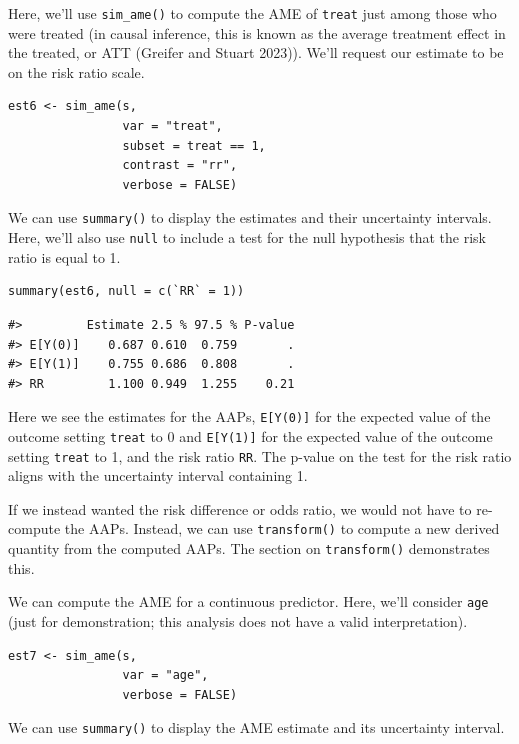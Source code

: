Here, we'll use \texttt{sim\_ame()} to compute the AME of \texttt{treat} just among those who were treated (in causal inference, this is known as the average treatment effect in the treated, or ATT (Greifer and Stuart 2023)). We'll request our estimate to be on the risk ratio scale.

\begin{verbatim}
est6 <- sim_ame(s,
                var = "treat",
                subset = treat == 1,
                contrast = "rr",
                verbose = FALSE)
\end{verbatim}

We can use \texttt{summary()} to display the estimates and their uncertainty intervals. Here, we'll also use \texttt{null} to include a test for the null hypothesis that the risk ratio is equal to 1.

\begin{verbatim}
summary(est6, null = c(`RR` = 1))
\end{verbatim}

\begin{verbatim}
#>         Estimate 2.5 % 97.5 % P-value
#> E[Y(0)]    0.687 0.610  0.759       .
#> E[Y(1)]    0.755 0.686  0.808       .
#> RR         1.100 0.949  1.255    0.21
\end{verbatim}

Here we see the estimates for the AAPs, \texttt{E{[}Y(0){]}} for the expected value of the outcome setting \texttt{treat} to 0 and \texttt{E{[}Y(1){]}} for the expected value of the outcome setting \texttt{treat} to 1, and the risk ratio \texttt{RR}. The p-value on the test for the risk ratio aligns with the uncertainty interval containing 1.

If we instead wanted the risk difference or odds ratio, we would not have to re-compute the AAPs. Instead, we can use \texttt{transform()} to compute a new derived quantity from the computed AAPs. The section on \texttt{transform()} demonstrates this.

We can compute the AME for a continuous predictor. Here, we'll consider \texttt{age} (just for demonstration; this analysis does not have a valid interpretation).

\begin{verbatim}
est7 <- sim_ame(s,
                var = "age",
                verbose = FALSE)
\end{verbatim}

We can use \texttt{summary()} to display the AME estimate and its uncertainty interval.

